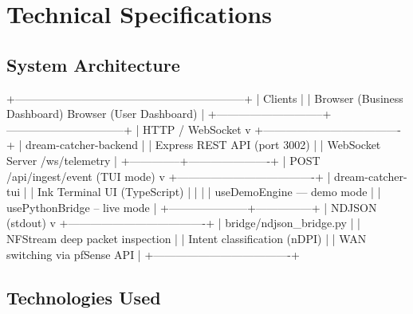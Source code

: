 \documentclass[11pt, a4paper]{article}
\begin{document}
\section{Technical Specifications}

\subsection{System Architecture}

\begin{verbbox}
+--------------------------------------------------------------+
|                          Clients                             |
|   Browser (Business Dashboard)  Browser (User Dashboard)    |
+-----------------------------+--------------------------------+
                              |  HTTP / WebSocket
                              v
+-------------------------------------+
|        dream-catcher-backend        |
|   Express REST API   (port 3002)    |
|   WebSocket Server  /ws/telemetry   |
+--------------+----------------------+
               |  POST /api/ingest/event   (TUI mode)
               v
+-------------------------------------+
|         dream-catcher-tui           |
|   Ink Terminal UI   (TypeScript)    |
|                                     |
|   useDemoEngine  --- demo mode      |
|   usePythonBridge -- live mode      |
+---------------------+---------------+
                      |  NDJSON (stdout)
                      v
+-------------------------------------+
|      bridge/ndjson_bridge.py        |
|   NFStream  deep packet inspection  |
|   Intent classification (nDPI)      |
|   WAN switching via pfSense API     |
+-------------------------------------+
\end{verbbox}

\subsection{Technologies Used}
\end{document}
